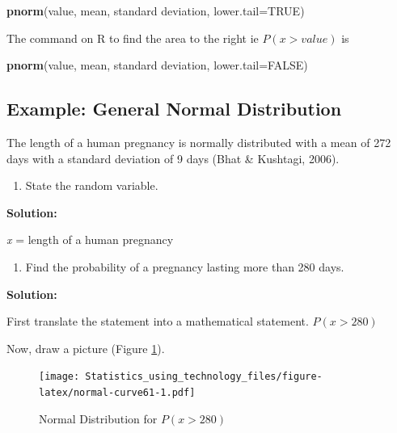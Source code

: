 \documentclass[
]{book}
\newenvironment{Shaded}{\begin{snugshade}}{\end{snugshade}}
\newcommand{\DataTypeTok}[1]{\textcolor[rgb]{0.13,0.29,0.53}{#1}}
\newcommand{\KeywordTok}[1]{\textcolor[rgb]{0.13,0.29,0.53}{\textbf{#1}}}
\newcommand{\NormalTok}[1]{#1}
\newcommand{\OtherTok}[1]{\textcolor[rgb]{0.56,0.35,0.01}{#1}}
\providecommand{\tightlist}{%
  \setlength{\itemsep}{0pt}\setlength{\parskip}{0pt}}
\begin{document}
\begin{Shaded}
\begin{Highlighting}[]
\KeywordTok{pnorm}\NormalTok{(value, mean, standard deviation, }\DataTypeTok{lower.tail=}\OtherTok{TRUE}\NormalTok{)}
\end{Highlighting}
\end{Shaded}

The command on R to find the area to the right ie \(P(x>value)\) is

\begin{Shaded}
\begin{Highlighting}[]
\KeywordTok{pnorm}\NormalTok{(value, mean, standard deviation, }\DataTypeTok{lower.tail=}\OtherTok{FALSE}\NormalTok{)}
\end{Highlighting}
\end{Shaded}

\hypertarget{example-general-normal-distribution}{%
\subsection{Example: General Normal Distribution}\label{example-general-normal-distribution}}

The length of a human pregnancy is normally distributed with a mean of 272 days with a standard deviation of 9 days (Bhat \& Kushtagi, 2006).

\begin{enumerate}
\def\labelenumi{\alph{enumi}.}
\tightlist
\item
  State the random variable.
\end{enumerate}

\textbf{Solution:}

\emph{x} = length of a human pregnancy

\begin{enumerate}
\def\labelenumi{\alph{enumi}.}
\setcounter{enumi}{1}
\tightlist
\item
  Find the probability of a pregnancy lasting more than 280 days.
\end{enumerate}

\textbf{Solution:}

First translate the statement into a mathematical statement. \(P(x>280)\)

Now, draw a picture (Figure \ref{fig:normal-curve61}).



\begin{figure}
\centering
\texttt{[image: Statistics\_using\_technology\_files/figure-latex/normal-curve61-1.pdf]}
\caption{\label{fig:normal-curve61}Normal Distribution for \(P(x>280)\)}
\end{figure}
\end{document}
